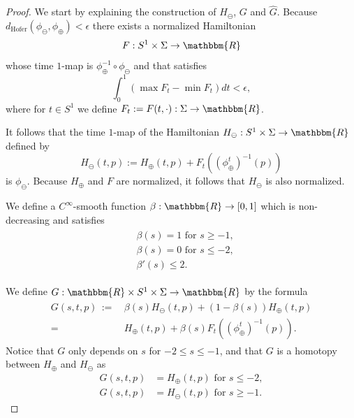 \documentclass[AHL,Unicode,longabstracts,published]{cedram}
\newcommand{\R}{\mathbbm{R}}
\newcommand{\hofer}{\mathrm{Hofer}}
\newcommand{\hofer}{\mathrm{Hofer}}
\begin{document}
\begin{proof}
We start by explaining the construction of $H_\ominus$, $G$ and $\widehat{G}$. Because $d_{\hofer}(\phi_\ominus,\phi_\oplus)<\epsilon$ there exists a normalized Hamiltonian
\begin{equation}\label{eq:Hminus}
F:S^1\times \Sigma \to \R
\end{equation}
whose time $1$-map is $\phi^{-1}_\oplus \circ \phi_\ominus$ and that satisfies
\begin{equation}\label{eq:Hoferdistance}
\int_0^1 (\max F_t - \min F_t) dt< \epsilon,
\end{equation}
where for $t\in S^1$ we define $F_t:=F(t,\cdot): \Sigma \to \R$.

It follows that the time $1$-map of the Hamiltonian $H_\ominus: S^1 \times \Sigma \to \R$ defined by
\begin{equation}\label{eq:F}
H_\ominus(t,p) := H_\oplus(t,p) + F_t\left((\phi_\oplus^t)^{-1}(p)\right)
\end{equation}
is $\phi_\ominus$. Because $H_\oplus$ and $F$ are normalized, it follows that $H_\ominus$ is also normalized.

We define a $C^\infty$-smooth function $\beta: \R \to [0,1]$ which is non-decreasing and satisfies
\begin{align}\label{eq:beta}
\begin{split}
& \beta(s) = 1 \text{ for } s \geq -1, \\
& \beta(s)= 0 \text{ for } s \leq -2, \\
& \beta'(s) \leq 2.
\end{split}
\end{align}


We define $G : \R \times S^1 \times \Sigma \to \R$ by the formula
\begin{align}\label{eq:G}
\begin{split}
G(s,t,p) \,{:=}& \,\beta(s) H_\ominus(t,p) + (1-\beta(s))H_\oplus(t,p)\\
 =&\, H_\oplus(t,p) + \beta(s) F_t((\phi_\oplus^t)^{-1}(p)).
\end{split}
\end{align}
Notice that $G$ only depends on $s$ for $-2 \leq s \leq -1$, and that $G$ is a homotopy between $H_\oplus$ and $H_\ominus$ as
\begin{equation}\label{eq:Gproperties}
\begin{split}
G(s,t,p) &= H_\oplus(t,p) \text{ for } s\leq -2,
\\
G(s,t,p) &= H_\ominus(t,p) \text{ for } s\geq -1.
\end{split}
\end{equation}


\end{proof}
\end{document}
